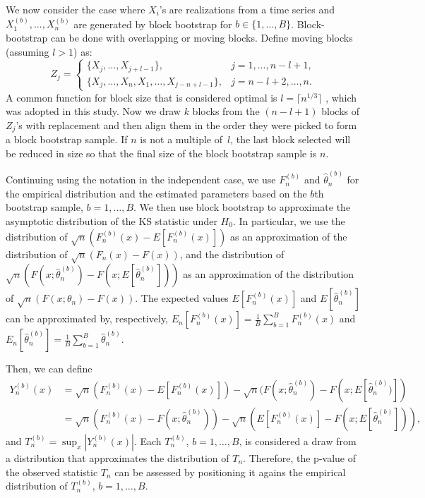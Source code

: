 \documentclass[APA,Times1COL]{WileyNJDv5} %
\begin{document}
We now consider the case where $X_i$'s are realizations from a time series and
$X^{(b)}_1,...,X^{(b)}_n$ are generated by block bootstrap for 
$b \in \{1, \ldots, B\}$.  
Block-bootstrap can be done with overlapping or moving blocks.
Define moving blocks (assuming $l > 1$) as:
\begin{equation*}
Z_j =
    \begin{cases}
        \{X_j, \ldots, X_{j + l - 1}\}, & j = 1, \dots, n - l + 1,\\
        \{X_j, \ldots, X_n, X_1, \ldots, X_{j-n+l-1}\}, & j = n - l
        + 2 ,\dots, n.
    \end{cases}
\end{equation*}
A common 
function for block size that is considered optimal is 
$l = \lceil n^{1/3} \rceil$ \citep{buhlmann1999block},  
which was adopted in this study.
Now we draw $k$ blocks from the $(n - l + 1)$ blocks 
of $Z_j$'s with replacement and then align them in the order they were picked to
form a block bootstrap sample. If $n$ is not a multiple of~$l$, the last block 
selected will be reduced in size so that the final size of the block bootstrap 
sample is $n$.


Continuing using the notation in the independent case,
we use $F^{(b)}_n$ and $\hat\theta^{(b)}_n$ for the empirical distribution and
the estimated parameters based on the $b$th bootstrap sample,
$b = 1, \ldots, B$.
We then use block bootstrap to approximate the asymptotic distribution of
the KS statistic under $H_0$. In particular, we
use the distribution of $\sqrt{n}(F^{(b)}_n(x) - E[F^{(b)}_n(x)])$
as an approximation of the distribution of
$\sqrt{n}(F_n(x) - F(x))$, and the distribution of 
$\sqrt{n}(F(x; \hat\theta^{(b)}_n) - F(x; E[\hat\theta^{(b)}_n]))$ as
an approximation of the distribution of $\sqrt{n}(F(x; \theta_n) - F(x))$.
The expected values $E[F^{(b)}_n(x)]$ and
$E[\hat\theta^{(b)}_n]$ can be approximated by, respectively,
$E_n[F^{(b)}_n(x)] = \frac{1}{B}\sum_{b = 1}^BF^{(b)}_n(x)$ and
$E_n[\hat\theta^{(b)}_n]  =  \frac{1}{B}\sum_{b = 1}^B\hat\theta^{(b)}_n$.


Then, we can define
\begin{align*}
  Y^{(b)}_n(x) &= \sqrt{n}(F^{(b)}_n(x) - E[F^{(b)}_n(x)]) - 
             \sqrt{n}(F(x; \hat\theta^{(b)}_n) - F(x; E[\hat\theta^{(b)}_n)]) \\
           &= \sqrt{n}(F^{(b)}_n(x) - F(x; \hat\theta^{(b)}_n)) -
             \sqrt{n}(E[F^{(b)}_n(x)] - F(x; E[\hat\theta^{(b)}_n])),
\end{align*}
and $T^{(b)}_n = \sup_x|Y^{(b)}_n(x)|$. Each $T_n^{(b)}$,
$b =1, \ldots, B$, is considered a draw from a distribution that approximates
the distribution of $T_n$. Therefore, the p-value of the observed statistic
$T_n$ can be assessed by positioning it agains the empirical distribution of
$T_n^{(b)}$, $b = 1, \ldots, B$.
\end{document}
